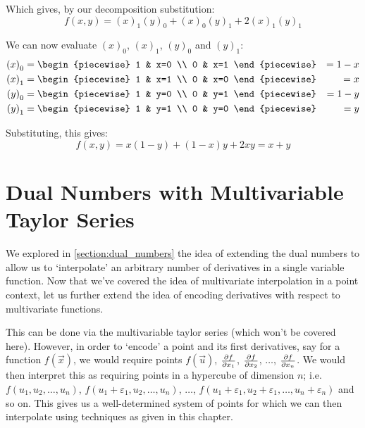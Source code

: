 \begin{example}
    Which gives, by our decomposition substitution:
    $$
        f(x,y)={(x)}_{1}{(y)}_{0}+{(x)}_{0}{(y)}_{1}+2{(x)}_{1}{(y)}_{1}
    $$

    We can now evaluate ${(x)}_0$, ${(x)}_1$, ${(y)}_0$ and ${(y)}_1$:
    \begin{align*}
        {(x)}_0 &= \begin{piecewise}
            1 & x=0 \\
            0 & x=1
        \end{piecewise} &= 1-x \\
        {(x)}_1 &= \begin{piecewise}
            1 & x=1 \\
            0 & x=0
        \end{piecewise} &= x \\
        {(y)}_0 &= \begin{piecewise}
            1 & y=0 \\
            0 & y=1
        \end{piecewise} &= 1-y \\
        {(y)}_1 &= \begin{piecewise}
            1 & y=1 \\
            0 & y=0
        \end{piecewise} &= y \\
    \end{align*}

    Substituting, this gives:
    $$
        f(x,y)=x(1-y)+(1-x)y+2xy=x+y
    $$
\end{example}

\section{Dual Numbers with Multivariable Taylor Series}
We explored in \ref{section:dual_numbers} the idea of extending the dual numbers to allow us to `interpolate' an arbitrary number of derivatives in a single variable function. Now that we've covered the idea of multivariate interpolation in a point context, let us further extend the idea of encoding derivatives with respect to multivariate functions.

This can be done via the multivariable taylor series (which won't be covered here). However, in order to `encode' a point and its first derivatives, say for a function $f(\vec{x})$, we would require points $f(\vec{u})$, $\pdv{f}{x_1} (\vec{u})$, $\pdv{f}{x_2} (\vec{u})$, $\dots$, $\pdv{f}{x_n} (\vec{u})$. We would then interpret this as requiring points in a hypercube of dimension $n$; i.e. $f(u_1,u_2,\dots,u_n)$, $f(u_1+\varepsilon_1,u_2,\dots,u_n)$, $\dots$, $f(u_1+\varepsilon_1,u_2+\varepsilon_1,\dots,u_n+\varepsilon_n)$ and so on. This gives us a well-determined system of points for which we can then interpolate using techniques as given in this chapter.


\newpage